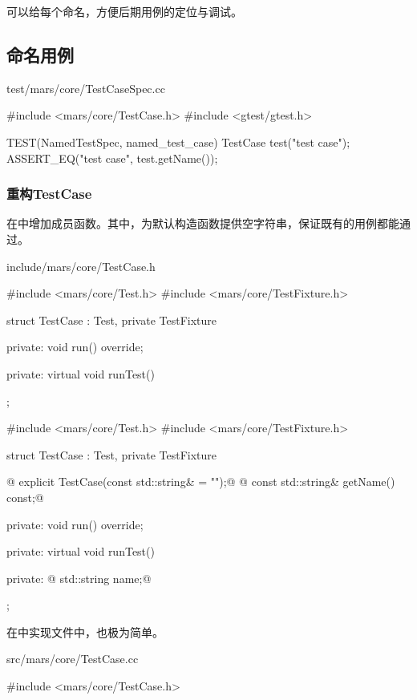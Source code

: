 \begin{content}

可以给每个命名，方便后期用例的定位与调试。

\subsection{命名用例}

\begin{nodiff}{test/mars/core/TestCaseSpec.cc}
 \begin{c++}
#include <mars/core/TestCase.h>
#include <gtest/gtest.h>

TEST(NamedTestSpec, named_test_case) {
  TestCase test("test case");
  ASSERT_EQ("test case", test.getName());
}
 \end{c++}
\end{nodiff}

\subsubsection{重构TestCase}

在中增加成员函数。其中，为默认构造函数提供空字符串，保证既有的用例都能通过。

\begin{diff}{include/mars/core/TestCase.h}
 \begin{minicpp}
#include <mars/core/Test.h>
#include <mars/core/TestFixture.h>

struct TestCase : Test, private TestFixture {
private:
  void run() override;

private:
  virtual void runTest() {}
};
 \end{minicpp}
\tcblower
 \begin{minicpp}
#include <mars/core/Test.h>
#include <mars/core/TestFixture.h>

struct TestCase : Test, private TestFixture {
@  explicit TestCase(const std::string& = "");@
@  const std::string& getName() const;@

private:
  void run() override;

private:
  virtual void runTest() {}

private:
@  std::string name;@
};
 \end{minicpp}
\end{diff}

在中实现文件中，也极为简单。

\begin{diff}{src/mars/core/TestCase.cc}
 \begin{minicpp}
#include <mars/core/TestCase.h>


\end{minicpp}
\end{diff}
\end{content}
